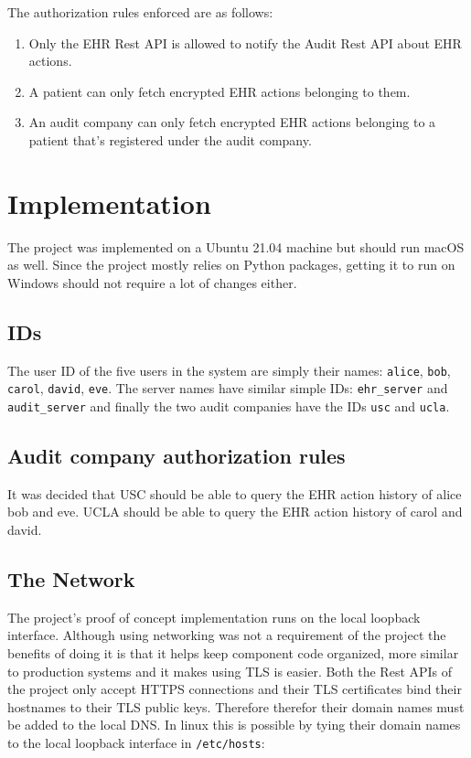 \documentclass[11pt]{article}
\begin{document}
\begin{flushleft}
The authorization rules enforced are as follows:

\begin{enumerate}
	\item Only the EHR Rest API is allowed to notify the Audit Rest API about EHR actions.
	\item A patient can only fetch encrypted EHR actions belonging to them.
	\item An audit company can only fetch encrypted EHR actions belonging to a patient that's registered under the audit company.
\end{enumerate}


\section{Implementation}

The project was implemented on a Ubuntu 21.04 machine but should run macOS as well. Since the project mostly relies on Python packages, getting it to run on Windows should not require a lot of changes either.

\subsection{IDs}

The user ID of the five users in the system are simply their names: \verb+alice+, \verb+bob+, \verb+carol+, \verb+david+, \verb+eve+. The server names have similar simple IDs: \verb+ehr_server+ and \verb+audit_server+ and finally the two audit companies have the IDs \verb+usc+ and \verb+ucla+.

\subsection{Audit company authorization rules}

It was decided that USC should be able to query the EHR action history of alice bob and eve. UCLA should be able to query the EHR action history of carol and david.

\subsection{The Network}

The project's proof of concept implementation runs on the local loopback interface. Although using networking was not a requirement of the project the benefits of doing it is that it helps keep component code organized, more similar to production systems and it makes using TLS is easier. Both the Rest APIs of the project only accept HTTPS connections and their TLS certificates bind their hostnames to their TLS public keys. Therefore therefor their domain names must be added to the local DNS. In linux this is possible by tying their domain names to the local loopback interface in \verb+/etc/hosts+:


\end{flushleft}
\end{document}
